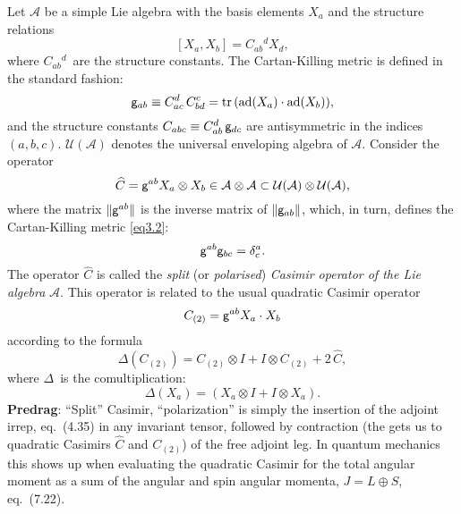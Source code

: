 \begin{description}
Let $\mathcal{A}$ be a simple Lie algebra with the basis elements $X_a$
and the structure relations
\begin{equation}
\label{eq3.1}
[X_a,X_b]= C{}_{ab}{}^dX_d,
\end{equation}
where $C{}_{ab}{}^d$~are the structure constants. The Cartan-Killing metric is defined in the standard fashion:
\begin{equation}
\label{eq3.2}
{\sf g}_{ab} \equiv C^{d}_{ac} \, C^{c}_{bd} =
\mathrm{tr}\,(\mathrm{ad}(X_a)\cdot \mathrm{ad}(X_b)),
\end{equation}
 and the structure constants $C_{abc} \equiv C^{d}_{ab} \, {\sf g}_{dc}$
 are antisymmetric in the indices $(a,b,c)$.
$\mathcal{U}(\mathcal{A})$ denotes the universal enveloping algebra of $\mathcal{A}$. Consider the operator
\begin{equation}
\label{eq3.3}
\widehat{C}  = {\sf g}^{ab} X_a \otimes
  X_b \in \mathcal{A}  \otimes  \mathcal{A}
   \subset \mathcal{U}(\mathcal{A}) \otimes\mathcal{U}(\mathcal{A}),
\end{equation}
 where the matrix $\|{\sf g}^{ab}\|$ is the inverse matrix of $\|{\sf g}_{ab}\|$, which, in turn, defines the Cartan-Killing metric \eqref{eq3.2}:
\begin{equation}
\label{eq3.4}
 {\sf g}^{ab}{\sf g}_{bc}=\delta^a_c.
 \end{equation}
 The operator $\widehat{C}$ is called the \textit{split} (or \textit{polarised}) \textit{Casimir operator of the Lie algebra} $\mathcal{A}$.
This operator is related to the usual quadratic Casimir operator
\begin{equation}
\label{eq3.5}
 C_{(2)} = {\sf g}^{ab}X_a \cdot X_b
\end{equation}
according to the formula
\begin{equation}
\label{eq3.6}
 \Delta(C_{(2)}) = C_{(2)} \otimes I + I \otimes C_{(2)} + 2 \, \widehat{C} ,
\end{equation}
where $\Delta$~is the comultiplication:
\begin{equation}
\label{eq3.7}
\Delta(X_a) = (X_a \otimes I + I \otimes X_a).
\end{equation}
{\bf Predrag}: ``Split'' Casimir, ``polarization'' is simply the
insertion of the adjoint irrep, 
{eq.~(4.35)} in any invariant tensor, followed by contraction (the gets
us to quadratic Casimirs $\widehat{C}$ and $C_{(2)}$) of the free adjoint
leg. In quantum mechanics this shows up when evaluating the quadratic
Casimir for the total angular moment as a sum of the angular and spin
angular momenta, $J=L\oplus{S}$, 
{eq.~(7.22)}.


\end{description}
